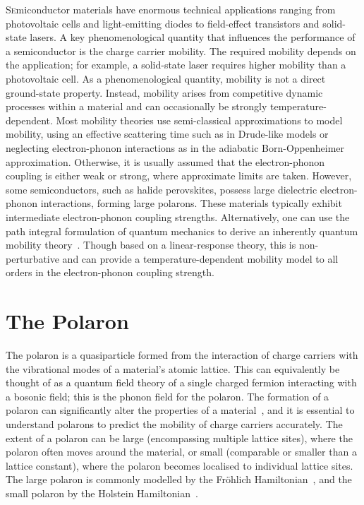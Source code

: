 \lettrine{S}emiconductor materials have enormous technical applications ranging from photovoltaic cells and light-emitting diodes to field-effect transistors and solid-state lasers. A key phenomenological quantity that influences the performance of a semiconductor is the charge carrier mobility. The required mobility depends on the application; for example, a solid-state laser requires higher mobility than a photovoltaic cell. As a phenomenological quantity, mobility is not a direct ground-state property. Instead, mobility arises from competitive dynamic processes within a material and can occasionally be strongly temperature-dependent. Most mobility theories use semi-classical approximations to model mobility, using an effective scattering time such as in Drude-like models or neglecting electron-phonon interactions as in the adiabatic Born-Oppenheimer approximation. Otherwise, it is usually assumed that the electron-phonon coupling is either weak or strong, where approximate limits are taken. However, some semiconductors, such as halide perovskites, possess large dielectric electron-phonon interactions, forming large polarons. These materials typically exhibit intermediate electron-phonon coupling strengths. Alternatively, one can use the path integral formulation of quantum mechanics to derive an inherently quantum mobility theory~\cite{feynman_slow_1955, feynman_mobility_1962}. Though based on a linear-response theory, this is non-perturbative and can provide a temperature-dependent mobility model to all orders in the electron-phonon coupling strength.


\section{The Polaron}
\label{sec:1-2}

The polaron is a quasiparticle formed from the interaction of charge carriers with the vibrational modes of a material's atomic lattice. This can equivalently be thought of as a quantum field theory of a single charged fermion interacting with a bosonic field; this is the phonon field for the polaron. The formation of a polaron can significantly alter the properties of a material~\cite{franchini_polarons_2021}, and it is essential to understand polarons to predict the mobility of charge carriers accurately. The extent of a polaron can be large (encompassing multiple lattice sites), where the polaron often moves around the material, or small (comparable or smaller than a lattice constant), where the polaron becomes localised to individual lattice sites. The large polaron is commonly modelled by the Fröhlich Hamiltonian~\cite{frohlich_electrons_1954}, and the small polaron by the Holstein Hamiltonian~\cite{holstein_studies_1959-1, holstein_studies_1959}.

